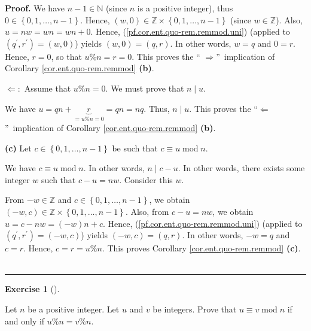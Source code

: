 \documentclass[numbers=enddot,12pt,final,onecolumn,notitlepage]{scrartcl}%
\newcounter{exer}
\numberwithin{exer}{subsection}
\theoremstyle{definition}
\newtheorem{exmp}[exer]{Exercise}
\newenvironment{exercise}[1][]
{\begin{exmp}[#1]\begin{leftbar}}
{\end{leftbar}\end{exmp}}
\newenvironment{proof}[1][Proof]{\noindent\textbf{#1.} }{\ \rule{0.5em}{0.5em}}
\begin{document}
\begin{proof}
We have $n-1\in\mathbb{N}$ (since $n$ is a positive integer), thus
$0\in\left\{  0,1,\ldots,n-1\right\}  $. Hence, $\left(  w,0\right)
\in\mathbb{Z}\times\left\{  0,1,\ldots,n-1\right\}  $ (since $w\in\mathbb{Z}%
$). Also, $u=nw=wn=wn+0$. Hence, (\ref{pf.cor.ent.quo-rem.remmod.uni})
(applied to $\left(  q^{\prime},r^{\prime}\right)  =\left(  w,0\right)  $)
yields $\left(  w,0\right)  =\left(  q,r\right)  $. In other words, $w=q$ and
$0=r$. Hence, $r=0$, so that $u\%n=r=0$. This proves the \textquotedblleft%
$\Longrightarrow$\textquotedblright\ implication of Corollary
\ref{cor.ent.quo-rem.remmod} \textbf{(b)}.

$\Longleftarrow:$ Assume that $u\%n=0$. We must prove that $n\mid u$.

We have $u=qn+\underbrace{r}_{=u\%n=0}=qn=nq$. Thus, $n\mid u$. This proves
the \textquotedblleft$\Longleftarrow$\textquotedblright\ implication of
Corollary \ref{cor.ent.quo-rem.remmod} \textbf{(b)}.

\textbf{(c)} Let $c\in\left\{  0,1,\ldots,n-1\right\}  $ be such that $c\equiv
u\operatorname{mod}n$.

We have $c\equiv u\operatorname{mod}n$. In other words, $n\mid c-u$. In other
words, there exists some integer $w$ such that $c-u=nw$. Consider this $w$.

From $-w\in\mathbb{Z}$ and $c\in\left\{  0,1,\ldots,n-1\right\}  $, we obtain
$\left(  -w,c\right)  \in\mathbb{Z}\times\left\{  0,1,\ldots,n-1\right\}  $.
Also, from $c-u=nw$, we obtain $u=c-nw=\left(  -w\right)  n+c$. Hence,
(\ref{pf.cor.ent.quo-rem.remmod.uni}) (applied to $\left(  q^{\prime
},r^{\prime}\right)  =\left(  -w,c\right)  $) yields $\left(  -w,c\right)
=\left(  q,r\right)  $. In other words, $-w=q$ and $c=r$. Hence, $c=r=u\%n$.
This proves Corollary \ref{cor.ent.quo-rem.remmod} \textbf{(c)}.
\end{proof}

\begin{exercise}
\label{exe.ent.quo-rem.mod=rem}Let $n$ be a positive integer. Let $u$ and $v$
be integers. Prove that $u\equiv v\operatorname{mod}n$ if and only if
$u\%n=v\%n$.
\end{exercise}
\end{document}
